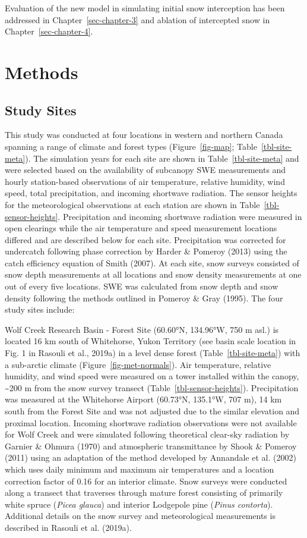 \documentclass[
  letterpaper,
]{tex/uofsthesis-cs}
\begin{document}
Evaluation of the new model in simulating initial snow interception has
been addressed in Chapter~\ref{sec-chapter-3} and ablation of
intercepted snow in Chapter~\ref{sec-chapter-4}.

\section{Methods}\label{methods-1}

\subsection{Study Sites}\label{study-sites}

This study was conducted at four locations in western and northern
Canada spanning a range of climate and forest types
(Figure~\ref{fig-map}; Table~\ref{tbl-site-meta}). The simulation years
for each site are shown in Table~\ref{tbl-site-meta} and were selected
based on the availability of subcanopy SWE measurements and hourly
station-based observations of air temperature, relative humidity, wind
speed, total precipitation, and incoming shortwave radiation. The sensor
heights for the meteorological observations at each station are shown in
Table~\ref{tbl-sensor-heights}. Precipitation and incoming shortwave
radiation were measured in open clearings while the air temperature and
speed measurement locations differed and are described below for each
site. Precipitation was corrected for undercatch following phase
correction by Harder \& Pomeroy (2013) using the catch efficiency
equation of Smith (2007). At each site, snow surveys consisted of snow
depth measurements at all locations and snow density measurements at one
out of every five locations. SWE was calculated from snow depth and snow
density following the methods outlined in Pomeroy \& Gray (1995). The
four study sites include:

Wolf Creek Research Basin - Forest Site (60.60°N, 134.96°W, 750 m asl.)
is located 16 km south of Whitehorse, Yukon Territory (see basin scale
location in Fig. 1 in Rasouli et al., 2019a) in a level dense forest
(Table~\ref{tbl-site-meta}) with a sub-arctic climate
(Figure~\ref{fig-met-normals}). Air temperature, relative humidity, and
wind speed were measured on a tower installed within the canopy,
\textasciitilde200 m from the snow survey transect
(Table~\ref{tbl-sensor-heights}). Precipitation was measured at the
Whitehorse Airport (60.73°N, 135.1°W, 707 m), 14 km south from the
Forest Site and was not adjusted due to the similar elevation and
proximal location. Incoming shortwave radiation observations were not
available for Wolf Creek and were simulated following theoretical
clear-sky radiation by Garnier \& Ohmura (1970) and atmospheric
transmittance by Shook \& Pomeroy (2011) using an adaptation of the
method developed by Annandale et al. (2002) which uses daily minimum and
maximum air temperatures and a location correction factor of 0.16 for an
interior climate. Snow surveys were conducted along a transect that
traverses through mature forest consisting of primarily white spruce
(\emph{Picea glauca}) and interior Lodgepole pine (\emph{Pinus
contorta}). Additional details on the snow survey and meteorological
measurements is described in Rasouli et al. (2019a).
\end{document}
